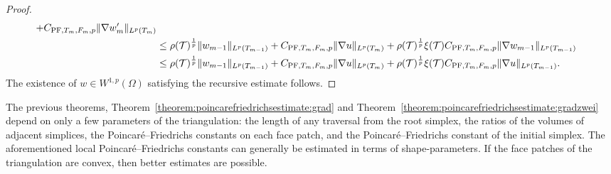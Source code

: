 \documentclass[12pt,a4paper]{article}
\begin{document}
\begin{proof}
\begin{align*}
        + 
        C_{{\rm PF},T_{m},F_{m},p} 
        \| \nabla w'_{m} \|_{L^{p}(T_{m})} 
        \\&
        \leq  
        \rho({\mathcal T})^{\frac 1 p} 
        \| w_{m-1} \|_{L^{p}(T_{m-1})} 
        + 
        C_{{\rm PF},T_{m},F_{m},p} 
        \| \nabla u \|_{L^{p}(T_{m})} 
        + 
        \rho({\mathcal T})^{\frac 1 p} \xi({\mathcal T})
        C_{{\rm PF},T_{m},F_{m},p} 
        \| \nabla w_{m-1} \|_{L^{p}(T_{m-1})} 
        \\&
        \leq  
        \rho({\mathcal T})^{\frac 1 p} 
        \| w_{m-1} \|_{L^{p}(T_{m-1})} 
        + 
        C_{{\rm PF},T_{m},F_{m},p} 
        \| \nabla u \|_{L^{p}(T_{m})} 
        + 
        \rho({\mathcal T})^{\frac 1 p} \xi({\mathcal T})
        C_{{\rm PF},T_{m},F_{m},p} 
        \| \nabla u \|_{L^{p}(T_{m-1})} 
        .
    \end{align*}
    The existence of $w \in W^{1,p}(\Omega)$ satisfying the recursive estimate follows. 
\end{proof}

\begin{remark}
    The previous theorems, Theorem~\ref{theorem:poincarefriedrichsestimate:grad} and Theorem~\ref{theorem:poincarefriedrichsestimate:gradzwei} 
    depend on only a few parameters of the triangulation:
    the length of any traversal from the root simplex, the ratios of the volumes of adjacent simplices,
    the Poincar\'e--Friedrichs constants on each face patch, and the Poincar\'e--Friedrichs constant of the initial simplex. 
    The aforementioned local Poincar\'e--Friedrichs constants can generally be estimated in terms of shape-parameters. 
    If the face patches of the triangulation are convex, then better estimates are possible. 
\end{remark}

\end{document}
